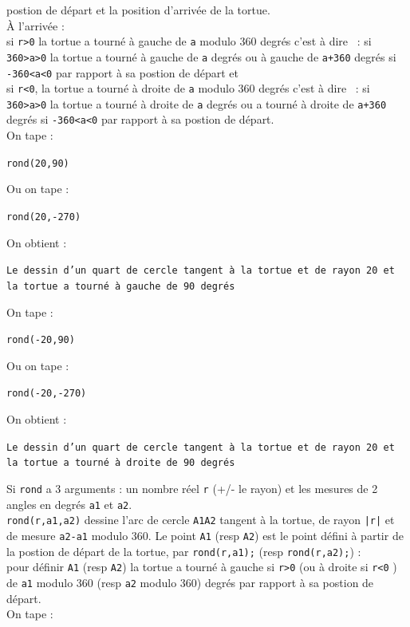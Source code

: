 \documentclass[a4paper,11pt]{book}
\begin{document}
postion de d\'epart et la position d'arriv\'ee de la tortue.\\
\`A l'arriv\'ee  :\\
si {\tt r>0} la tortue a tourn\'e \`a gauche de {\tt a} modulo 360 
degr\'es  c'est \`a dire ~: si 
{\tt 360>a>0} la tortue a tourn\'e \`a gauche de {\tt a} degr\'es ou \`a gauche
de {\tt a+360} degr\'es si {\tt -360<a<0} par
rapport \`a sa postion de d\'epart et\\
si {\tt r<0}, la tortue a tourn\'e \`a droite de {\tt a} modulo 360 
degr\'es c'est \`a dire ~: 
si {\tt 360>a>0} la tortue a tourn\'e \`a droite de {\tt a} degr\'es ou a 
tourn\'e \`a droite de {\tt a+360} degr\'es si {\tt -360<a<0} par rapport \`a 
sa postion de d\'epart.\\ 
On tape :
\begin{center}{\tt rond(20,90)}\end{center}
Ou on tape :
\begin{center}{\tt rond(20,-270)}\end{center}
On obtient :
\begin{center}{\tt Le dessin d'un quart de cercle tangent \`a la tortue et de rayon 20 et la tortue a tourn\'e \`a gauche de 90 degr\'es}\end{center}
On tape :
\begin{center}{\tt rond(-20,90)}\end{center}
Ou on tape :
\begin{center}{\tt rond(-20,-270)}\end{center}
On obtient :
\begin{center}{\tt Le dessin d'un quart de cercle tangent \`a la tortue et de rayon 20 et la tortue a tourn\'e \`a droite de 90 degr\'es}\end{center}
Si {\tt rond} a 3 arguments : un nombre r\'eel {\tt r} (+/- le rayon) et les 
mesures de 2 angles en degr\'es {\tt a1} et {\tt a2}.\\
{\tt rond(r,a1,a2)} dessine l'arc de cercle {\tt A1A2} tangent \`a la tortue, 
de rayon {\tt |r|} et de mesure {\tt a2-a1} modulo 360. Le point {\tt A1} (resp {\tt A2}) est le point d\'efini \`a partir de la postion de d\'epart de la tortue, par 
{\tt rond(r,a1);} (resp {\tt rond(r,a2);}) :\\
pour d\'efinir {\tt A1} (resp {\tt A2}) la tortue a tourn\'e \`a gauche si 
{\tt r>0} (ou \`a droite  si {\tt r<0} ) de {\tt a1} modulo 360 (resp {\tt a2} 
modulo 360) degr\'es par rapport \`a sa postion de d\'epart.\\  
On tape :
\end{document}
